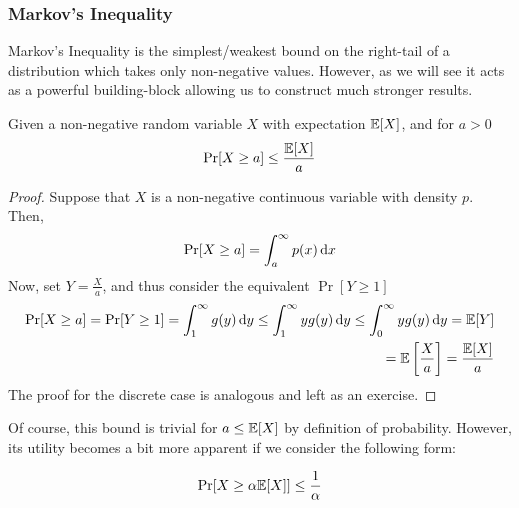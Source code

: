\subsubsection{Markov's Inequality}
Markov's Inequality is the simplest/weakest bound on the right-tail of a distribution which
takes only non-negative values. However, as we will see it acts as a powerful building-block
allowing us to construct much stronger results.
\begin{theorem}
    Given a non-negative random variable $X$ with expectation $\mathbb{E}[X]$, and for $a > 0$
    \begin{align*}
        \Pr[X \geq a] \leq \frac{\mathbb{E}[X]}{a}
    \end{align*}
\end{theorem}
\begin{proof}
    Suppose that $X$ is a non-negative continuous variable with density $p$. Then,
    \begin{align*}
        \Pr[X \geq a] = \int_a^\infty p(x) \, {\rm d}x 
    \end{align*}
    Now, set $Y = \frac{X}{a}$, and thus consider the equivalent $\Pr[Y \geq 1]$
    \begin{align*}
        \Pr[X \geq a] = \Pr[Y \geq 1] = \int_1^\infty g(y) \, {\rm d}y \leq \int_1^\infty yg(y) \, {\rm d}y \leq \int_0^\infty yg(y) \, {\rm d}y = \mathbb{E}[Y] \\
        = \mathbb{E}\left[\frac{X}{a}\right] = \frac{\mathbb{E}[X]}{a}
    \end{align*}
    The proof for the discrete case is analogous and left as an exercise.
\end{proof}
Of course, this bound is trivial for $a \leq \mathbb{E}[X]$ by definition of probability. However,
its utility becomes a bit more apparent if we consider the following form:
\begin{corollary}
    \begin{align*}
        \Pr[X \geq \alpha \mathbb{E}[X]] \leq \frac{1}{\alpha}
    \end{align*}
\end{corollary}
\label{sec:prob:conc:markov}
